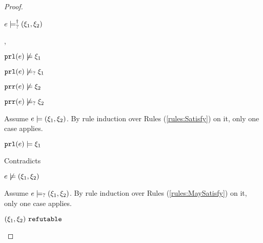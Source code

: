 \begin{proof}
\begin{byCases}
\begin{byCases}
\begin{byCases}
\begin{byCases}
\begin{pfsteps*}
                \item $e \models_{?}^{\dag} (\xi_1 , \xi_2)$ 
                \end{pfsteps*}
            \end{byCases}
        \item[\cnotsatisfyormay{\hprl{e}}{\xi_1},\cnotsatisfyormay{\hprr{e}}{\xi_2}]
            \begin{pfsteps*}
            \item $\mathtt{prl}(e) \not\models \xi_1$  
            \item $\mathtt{prl}(e) \not\models_{?} \xi_1$  
            \item $\mathtt{prr}(e) \not\models \xi_2$  
            \item $\mathtt{prr}(e) \not\models_{?} \xi_2$  
            \end{pfsteps*}
            Assume $e \models (\xi_1 , \xi_2)$. By rule induction over Rules (\ref{rules:Satisfy}) on it, only one case applies.
            \begin{byCases}
            \item[\text{(\ref{rule:CSNotValPair})}]
                \begin{pfsteps*}
                \item $\mathtt{prl}(e) \models \xi_1$ 
                \end{pfsteps*}
                Contradicts 
            \end{byCases}
            \begin{pfsteps*}
            \item $e \not\models (\xi_1 , \xi_2)$  
            \end{pfsteps*}
            Assume $e \models_{?} (\xi_1 , \xi_2)$. By rule induction over Rules (\ref{rules:MaySatisfy}) on it, only one case applies.
            \begin{byCases}
            \item[\text{(\ref{rule:CMSNotVal})}]
                \begin{pfsteps*}
                \item $(\xi_1 , \xi_2) ~\mathtt{refutable}$  
                \end{pfsteps*}

\end{byCases}
\end{byCases}
\end{byCases}
\end{byCases}
\end{proof}

